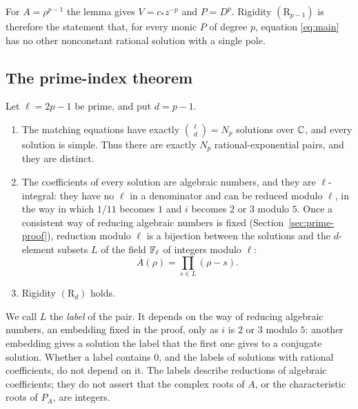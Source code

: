 For \(A=\rho^{p-1}\) the lemma gives \(V=c_\ast z^{-p}\) and \(P=D^p\).
Rigidity \((\mathrm R_{p-1})\) is therefore the statement that, for
every monic \(P\) of degree \(p\), equation \eqref{eq:main} has no other
nonconstant rational solution with a single pole.

\subsection{The prime-index theorem}\label{sec:prime}

\begin{theorem}\label{thm:prime}
Let \(\ell=2p-1\) be prime, and put \(d=p-1\).
\begin{enumerate}
\item[\textup{(a)}] The matching equations have exactly
\(\binom{\ell}{d}=N_p\) solutions over \(\mathbb C\), and every solution is
simple. Thus there are exactly \(N_p\) rational-exponential pairs, and
they are distinct.
\item[\textup{(b)}] The coefficients of every solution are algebraic
numbers, and they are \(\ell\)-integral: they have no \(\ell\) in a
denominator and can be reduced modulo \(\ell\), in the way in which
\(1/11\) becomes \(1\) and \(i\) becomes \(2\) or \(3\) modulo \(5\).
Once a consistent way of reducing algebraic numbers is fixed
(Section~\ref{sec:prime-proof}), reduction modulo \(\ell\) is a
bijection between the solutions and the \(d\)-element subsets \(L\) of
the field \(\mathbb F_\ell\) of integers modulo \(\ell\):
\begin{equation}\label{eq:prime-labels}
 \overline A(\rho)=\prod_{s\in L}(\rho-s).
\end{equation}
\item[\textup{(c)}] Rigidity \((\mathrm R_d)\) holds.
\end{enumerate}
\end{theorem}

We call \(L\) the \emph{label} of the pair. It depends on the way of
reducing algebraic numbers, an embedding fixed in the proof, only as
\(i\) is \(2\) or \(3\) modulo \(5\): another embedding gives a solution
the label that the first one gives to a conjugate solution. Whether a
label contains \(0\), and the labels of solutions with rational
coefficients, do not depend on it. The labels describe reductions of
algebraic coefficients; they do not assert that the complex roots of
\(A\), or the characteristic roots of \(P_A\), are integers.

